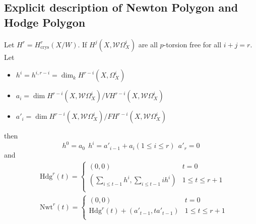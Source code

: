 \subsection{Explicit description of Newton Polygon and Hodge Polygon}
\begin{secthm}[Bloch]
	Let $H^r = H^r_{\text{crys}}(X/W)$. If $H^j(X,\mathcal{W}\Omega_X^i)$ are all $p$-torsion free for all $i+j = r$.  Let 
	\begin{itemize}
		\item $h^i= h^{i,r-i}= \dim_k H^{r-i}(X,\Omega_X^i)$
		\item $a_i = \dim H^{r-i}(X,\mathcal{W} \Omega_X^i)/VH^{r-i}(X, \mathcal{W}\Omega_X^i)$
		\item $a'_i = \dim H^{r-i}(X, \mathcal{W}\Omega_X^i)/F H^{r-i}(X,\mathcal{W}\Omega_X^i)$
	\end{itemize}
	then 
	\[
	h^0 = a_0\ \ h^i=a'_{i-1} + a_i  (1 \leq i \leq r) \ \ a'_r=0
	\]
	and 
	\[
	\begin{aligned}
	&\text{Hdg}^r(t) = \begin{cases} (0,0) & t=0 \\
	(\sum_{i \leq t-1}h^i, \sum_{i\leq t-1} i h^i)& 1 \leq t \leq r+1\\
	\end{cases}\\
	&\text{Nwt}^r(t) = \begin{cases}
	(0,0)& t=0\\
	\text{Hdg}^r(t) +(a'_{t-1}, ta'_{t-1})& 1 \leq t \leq r+1\\
	\end{cases}
	\end{aligned}
	\]
\end{secthm}

